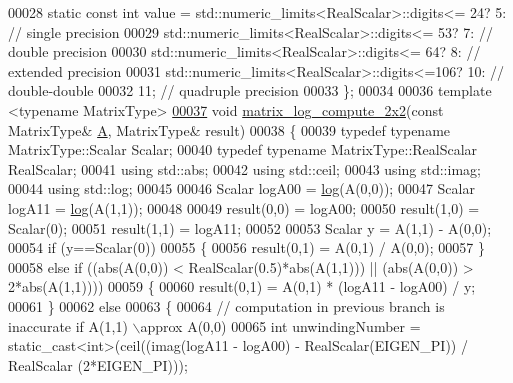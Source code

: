 \begin{DoxyCode}
00028   \textcolor{keyword}{static} \textcolor{keyword}{const} \textcolor{keywordtype}{int} value = std::numeric\_limits<RealScalar>::digits<= 24?  5:  \textcolor{comment}{// single precision}
00029                            std::numeric\_limits<RealScalar>::digits<= 53?  7:  \textcolor{comment}{// double precision}
00030                            std::numeric\_limits<RealScalar>::digits<= 64?  8:  \textcolor{comment}{// extended precision}
00031                            std::numeric\_limits<RealScalar>::digits<=106? 10:  \textcolor{comment}{// double-double}
00032                                                                          11;  \textcolor{comment}{// quadruple precision}
00033 \};
00034 
00036 \textcolor{keyword}{template} <\textcolor{keyword}{typename} MatrixType>
\hyperlink{namespace_eigen_1_1internal_a1cb8d312c017f94570a52317fd1ece5f}{00037} \textcolor{keywordtype}{void} \hyperlink{namespace_eigen_1_1internal_a1cb8d312c017f94570a52317fd1ece5f}{matrix\_log\_compute\_2x2}(\textcolor{keyword}{const} MatrixType& \hyperlink{group___core___module_class_eigen_1_1_matrix}{A}, MatrixType& result)
00038 \{
00039   \textcolor{keyword}{typedef} \textcolor{keyword}{typename} MatrixType::Scalar Scalar;
00040   \textcolor{keyword}{typedef} \textcolor{keyword}{typename} MatrixType::RealScalar RealScalar;
00041   \textcolor{keyword}{using} std::abs;
00042   \textcolor{keyword}{using} std::ceil;
00043   \textcolor{keyword}{using} std::imag;
00044   \textcolor{keyword}{using} std::log;
00045 
00046   Scalar logA00 = \hyperlink{structlog}{log}(A(0,0));
00047   Scalar logA11 = \hyperlink{structlog}{log}(A(1,1));
00048 
00049   result(0,0) = logA00;
00050   result(1,0) = Scalar(0);
00051   result(1,1) = logA11;
00052 
00053   Scalar y = A(1,1) - A(0,0);
00054   \textcolor{keywordflow}{if} (y==Scalar(0))
00055   \{
00056     result(0,1) = A(0,1) / A(0,0);
00057   \}
00058   \textcolor{keywordflow}{else} \textcolor{keywordflow}{if} ((abs(A(0,0)) < RealScalar(0.5)*abs(A(1,1))) || (abs(A(0,0)) > 2*abs(A(1,1))))
00059   \{
00060     result(0,1) = A(0,1) * (logA11 - logA00) / y;
00061   \}
00062   \textcolor{keywordflow}{else}
00063   \{
00064     \textcolor{comment}{// computation in previous branch is inaccurate if A(1,1) \(\backslash\)approx A(0,0)}
00065     \textcolor{keywordtype}{int} unwindingNumber = \textcolor{keyword}{static\_cast<}\textcolor{keywordtype}{int}\textcolor{keyword}{>}(ceil((imag(logA11 - logA00) - RealScalar(EIGEN\_PI)) / RealScalar
      (2*EIGEN\_PI)));

\end{DoxyCode}
